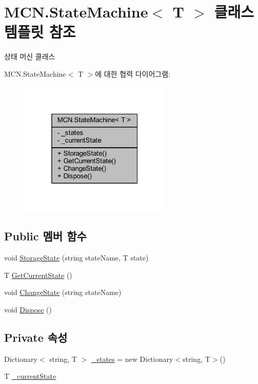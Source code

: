 \hypertarget{class_m_c_n_1_1_state_machine}{}\section{M\+C\+N.\+State\+Machine$<$ T $>$ 클래스 템플릿 참조}
\label{class_m_c_n_1_1_state_machine}


상태 머신 클래스  




M\+C\+N.\+State\+Machine$<$ T $>$에 대한 협력 다이어그램\+:\nopagebreak
\begin{figure}[H]
\begin{center}
\leavevmode
\includegraphics[width=205pt]{class_m_c_n_1_1_state_machine__coll__graph}
\end{center}
\end{figure}
\subsection*{Public 멤버 함수}
\begin{DoxyCompactItemize}
\item 
void \hyperlink{class_m_c_n_1_1_state_machine_a30d168379929d5bdb050f211e6273a8b}{Storage\+State} (string state\+Name, T state)
\item 
T \hyperlink{class_m_c_n_1_1_state_machine_a8f9a917858b5c42ca15bd47e6d382cd7}{Get\+Current\+State} ()
\item 
void \hyperlink{class_m_c_n_1_1_state_machine_a81eb33948ad947f9ef9c0771542a8c47}{Change\+State} (string state\+Name)
\item 
void \hyperlink{class_m_c_n_1_1_state_machine_a19c64816c4a7701a5e8658ab786a1615}{Dispose} ()
\end{DoxyCompactItemize}
\subsection*{Private 속성}
\begin{DoxyCompactItemize}
\item 
Dictionary$<$ string, T $>$ \hyperlink{class_m_c_n_1_1_state_machine_adf0f1417aacb073306b88563e7b3d740}{\+\_\+states} = new Dictionary$<$string, T$>$()
\item 
T \hyperlink{class_m_c_n_1_1_state_machine_a040bf7c13d5127fe983af2ef0a6315ec}{\+\_\+current\+State}
\end{DoxyCompactItemize}


